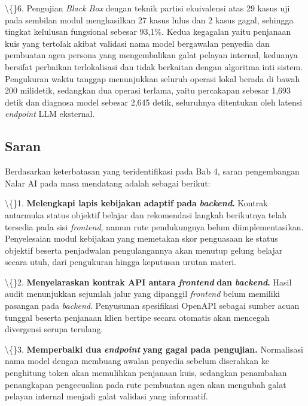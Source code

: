\documentclass[12pt,a4paper]{article}
\begin{document}
\textbackslash\{\}6. Pengujian \textit{Black Box} dengan teknik partisi ekuivalensi atas 29 kasus uji pada sembilan modul menghasilkan 27 kasus lulus dan 2 kasus gagal, sehingga tingkat kelulusan fungsional sebesar 93,1\%. Kedua kegagalan yaitu penjanaan kuis yang tertolak akibat validasi nama model bergawalan penyedia dan pembuatan agen persona yang mengembalikan galat pelayan internal, keduanya bersifat perbaikan terlokalisasi dan tidak berkaitan dengan algoritma inti sistem. Pengukuran waktu tanggap menunjukkan seluruh operasi lokal berada di bawah 200 milidetik, sedangkan dua operasi terlama, yaitu percakapan sebesar 1,693 detik dan diagnosa model sebesar 2,645 detik, seluruhnya ditentukan oleh latensi \textit{endpoint} LLM eksternal.



\subsection*{Saran}

Berdasarkan keterbatasan yang teridentifikasi pada Bab 4, saran pengembangan Nalar AI pada masa mendatang adalah sebagai berikut:



\textbackslash\{\}1. \textbf{Melengkapi lapis kebijakan adaptif pada} \textbf{\textit{backend}\textbf{}.} Kontrak antarmuka status objektif belajar dan rekomendasi langkah berikutnya telah tersedia pada sisi \textit{frontend}, namun rute pendukungnya belum diimplementasikan. Penyelesaian modul kebijakan yang memetakan skor penguasaan ke status objektif beserta penjadwalan pengulangannya akan menutup gelung belajar secara utuh, dari pengukuran hingga keputusan urutan materi.



\textbackslash\{\}2. \textbf{Menyelaraskan kontrak API antara} \textbf{\textit{frontend}} \textbf{dan} \textbf{\textit{backend}\textbf{}.} Hasil audit menunjukkan sejumlah jalur yang dipanggil \textit{frontend} belum memiliki pasangan pada \textit{backend}. Penyusunan spesifikasi OpenAPI sebagai sumber acuan tunggal beserta penjanaan klien bertipe secara otomatis akan mencegah divergensi serupa terulang.



\textbackslash\{\}3. \textbf{Memperbaiki dua} \textbf{\textit{endpoint}} \textbf{yang gagal pada pengujian.} Normalisasi nama model dengan membuang awalan penyedia sebelum diserahkan ke penghitung token akan memulihkan penjanaan kuis, sedangkan penambahan penangkapan pengecualian pada rute pembuatan agen akan mengubah galat pelayan internal menjadi galat validasi yang informatif.
\end{document}
